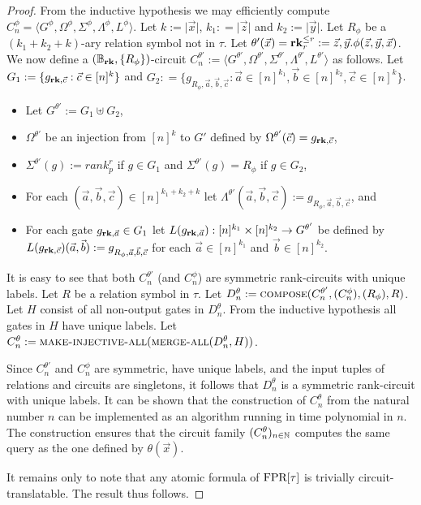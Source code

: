 \documentclass[../paper.tex]{subfiles}
\begin{document}
\begin{proof}
  From the inductive hypothesis we may efficiently compute $C^{\phi}_n = \langle
  G^{\phi}, \Omega^{\phi}, \Sigma^{\phi}, \Lambda^{\phi}, L^{\phi} \rangle$. Let
  $k:= \vert \vec{x} \vert$, $k_1 : = \vert \vec{z} \vert$ and $k_2 := \vert
  \vec{y} \vert$. Let $R_\phi$ be a $(k_1 + k_2 + k)$-ary relation symbol not in
  $\tau$. Let $\theta'(\vec{x}) = \text{\textbf{rk}}^{\leq r}_r := \vec{z}, \vec{y}. \phi
  (\vec{z}, \vec{y}, \vec{x})$. We now define a $(\mathbb{B}_{\text{\textbf{rk}}}, \{
  R_{\phi} \})$-circuit $C^{\theta'}_n:= \langle G^{\theta'}, \Omega^{\theta'},
  \Sigma^{\theta'}, \Lambda^{\theta'}, L^{\theta'}\rangle$ as follows. Let $G_1
  := \{g_{\text{\textbf{rk}}, \vec{c}} : \vec{c} \in [n]^k\}$ and $G_2 : = \{ g_{R_{\phi},
    \vec{a}, \vec{b}, \vec{c}} : \vec{a} \in [n]^{k_1}, \vec{b} \in [n]^{k_2},
  \vec{c} \in [n]^{k}\}$.
  
  \begin{itemize}
    \setlength\itemsep{0mm}
  \item Let $G^{\theta'} := G_1 \uplus G_2$,
  \item $\Omega^{\theta'}$ be an injection from $[n]^k$ to $G'$ defined by
    $\Omega^{\theta'}(\vec{c}) = g_{\text{\textbf{rk}}, \vec{c}}$,

  \item $\Sigma^{\theta'} (g) := rank^r_p$ if $g \in G_1$ and
    $\Sigma^{\theta'}(g) = R_\phi$ if $g \in G_2$,
  \item For each $(\vec{a}, \vec{b}, \vec{c}) \in [n]^{k_1 +k_2 + k}$ let
    $\Lambda^{\theta'} (\vec{a}, \vec{b}, \vec{c}) := g_{R_{\phi}, \vec{a},
      \vec{b}, \vec{c}}$, and

  \item For each gate $g_{\text{\textbf{rk}}, \vec{a}} \in G_1$ let $L(g_{\text{\textbf{rk}}, \vec{a}}):
    [n]^{k_1} \times [n]^{k_2} \rightarrow G^{\theta'}$ be defined by
    $L(g_{\text{\textbf{rk}}, \vec{c}})(\vec{a}, \vec{b}) := g_{R_\phi, \vec{a}, \vec{b},
      \vec{c}}$ for each $\vec{a} \in [n]^{k_1}$ and $\vec{b} \in [n]^{k_2}$.
  \end{itemize}
 
  It is easy to see that both $C^{\theta'}_n$ (and $C^{\phi}_n$) are symmetric
  rank-circuits with unique labels. Let $R$ be a relation symbol in $\tau$. Let
  $D^{\theta}_n := {\normalfont\textsc{compose}}(C^{\theta'}_n, (C^{\phi}_n), (R_\phi), R)$. Let
  $H$ consist of all non-output gates in $D^{\theta}_n$. From the inductive
  hypothesis all gates in $H$ have unique labels. Let $C^{\theta}_n :=
  {\normalfont\textsc{make-injective-all}}({\normalfont\textsc{merge-all}}(D^{\theta}_n, H))$.

  Since $C^{\theta'}_n$ and $C^{\phi}_n$ are symmetric, have unique labels, and
  the input tuples of relations and circuits are singletons, it follows that
  $D^{\theta}_n$ is a symmetric rank-circuit with unique labels. It can be shown
  that the construction of $C^{\theta}_n$ from the natural number $n$ can be
  implemented as an algorithm running in time polynomial in $n$. The
  construction ensures that the circuit family $(C^{\theta}_n)_{n \in \mathbb{N}}$
  computes the same query as the one defined by $\theta(\vec{x})$.
 
  It remains only to note that any atomic formula of $\text{\upshape FPR}[\tau]$ is trivially
  circuit-translatable. The result thus follows.
\end{proof}
\end{document}
